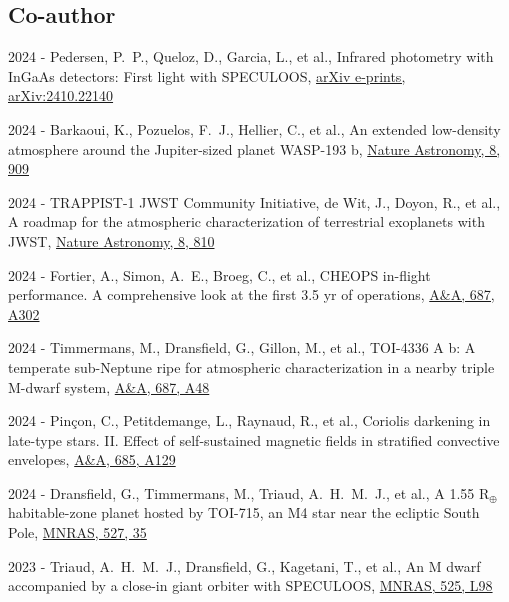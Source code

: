 \documentclass[10pt,letterpaper]{article}
\newcommand{\publi}[4]{\item #1 - #3, #2, #4}
\newcommand{\mnras}{MNRAS}
\newcommand{\aap}{A\&A}
\begin{document}
\subsection*{Co-author}
\begin{etaremune}
    \publi{2024}{Infrared photometry with InGaAs detectors: First light with SPECULOOS}
    {Pedersen, P.~P., Queloz, D., Garcia, L., et al.}
    {\href{https://ui.adsabs.harvard.edu/abs/2024arXiv241022140P}{arXiv e-prints, arXiv:2410.22140}}

    \publi{2024}{An extended low-density atmosphere around the Jupiter-sized planet WASP-193 b}
    {Barkaoui, K., Pozuelos, F.~J., Hellier, C., et al.}
    {\href{https://ui.adsabs.harvard.edu/abs/2024NatAs...8..909B}{Nature Astronomy, 8, 909}}
    
    \publi{2024}{A roadmap for the atmospheric characterization of terrestrial exoplanets with JWST}
    {TRAPPIST-1 JWST Community Initiative, de Wit, J., Doyon, R., et al.}
    {\href{https://ui.adsabs.harvard.edu/abs/2024NatAs...8..810T}{Nature Astronomy, 8, 810}}
    
    \publi{2024}{CHEOPS in-flight performance. A comprehensive look at the first 3.5 yr of operations}
    {Fortier, A., Simon, A.~E., Broeg, C., et al.}
    {\href{https://ui.adsabs.harvard.edu/abs/2024A\&A...687A.302F}{\aap, 687, A302}}
    
    \publi{2024}{TOI-4336 A b: A temperate sub-Neptune ripe for atmospheric characterization in a nearby triple M-dwarf system}
    {Timmermans, M., Dransfield, G., Gillon, M., et al.}
    {\href{https://ui.adsabs.harvard.edu/abs/2024A\&A...687A..48T}{\aap, 687, A48}}
    
    \publi{2024}{Coriolis darkening in late-type stars. II. Effect of self-sustained magnetic fields in stratified convective envelopes}
    {Pin{\c{c}}on, C., Petitdemange, L., Raynaud, R., et al.}
    {\href{https://ui.adsabs.harvard.edu/abs/2024A\&A...685A.129P}{\aap, 685, A129}}
    
    \publi{2024}{A 1.55 R$_{{\ensuremath{\oplus}}}$ habitable-zone planet hosted by TOI-715, an M4 star near the ecliptic South Pole}
    {Dransfield, G., Timmermans, M., Triaud, A.~H.~M.~J., et al.}
    {\href{https://ui.adsabs.harvard.edu/abs/2024MNRAS.527...35D}{\mnras, 527, 35}}
    
    \publi{2023}{An M dwarf accompanied by a close-in giant orbiter with SPECULOOS}
    {Triaud, A.~H.~M.~J., Dransfield, G., Kagetani, T., et al.}
    {\href{https://ui.adsabs.harvard.edu/abs/2023MNRAS.525L..98T}{\mnras, 525, L98}}
    

\end{etaremune}
\end{document}
